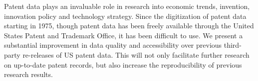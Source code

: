 Patent data plays an invaluable role in research into economic trends,
invention, innovation policy and technology strategy. Since the digitization of
patent data starting in 1975, though patent data has been freely available
through the United States Patent and Trademark Office, it has been difficult to
use. We present a substantial improvement in data quality and accessibility
over previous third-party re-releases of US patent data. This will not only
facilitate further research on up-to-date patent records, but also increase the
reproducibility of previous research results.
